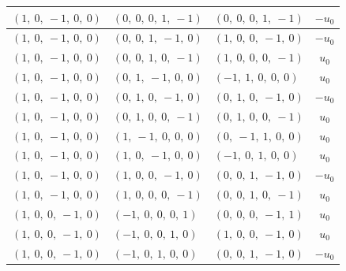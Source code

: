 \documentclass[11pt]{article}
\theoremstyle{definition}
\begin{document}
\begin{longtable}{|l|l|l|c|}
    \hline
    $\left( 1, \  0, \  -1, \  0, \  0\right)$ & $\left( 0, \  0, \  0, \  1, \  -1\right)$ & $\left( 0, \  0, \  0, \  1, \  -1\right)$ & $- u_{0}$ \\
    \hline
    $\left( 1, \  0, \  -1, \  0, \  0\right)$ & $\left( 0, \  0, \  1, \  -1, \  0\right)$ & $\left( 1, \  0, \  0, \  -1, \  0\right)$ & $- u_{0}$ \\
    \hline
    $\left( 1, \  0, \  -1, \  0, \  0\right)$ & $\left( 0, \  0, \  1, \  0, \  -1\right)$ & $\left( 1, \  0, \  0, \  0, \  -1\right)$ & $u_{0}$ \\
    \hline
    $\left( 1, \  0, \  -1, \  0, \  0\right)$ & $\left( 0, \  1, \  -1, \  0, \  0\right)$ & $\left( -1, \  1, \  0, \  0, \  0\right)$ & $u_{0}$ \\
    \hline
    $\left( 1, \  0, \  -1, \  0, \  0\right)$ & $\left( 0, \  1, \  0, \  -1, \  0\right)$ & $\left( 0, \  1, \  0, \  -1, \  0\right)$ & $- u_{0}$ \\
    \hline
    $\left( 1, \  0, \  -1, \  0, \  0\right)$ & $\left( 0, \  1, \  0, \  0, \  -1\right)$ & $\left( 0, \  1, \  0, \  0, \  -1\right)$ & $u_{0}$ \\
    \hline
    $\left( 1, \  0, \  -1, \  0, \  0\right)$ & $\left( 1, \  -1, \  0, \  0, \  0\right)$ & $\left( 0, \  -1, \  1, \  0, \  0\right)$ & $u_{0}$ \\
    \hline
    $\left( 1, \  0, \  -1, \  0, \  0\right)$ & $\left( 1, \  0, \  -1, \  0, \  0\right)$ & $\left( -1, \  0, \  1, \  0, \  0\right)$ & $u_{0}$ \\
    \hline
    $\left( 1, \  0, \  -1, \  0, \  0\right)$ & $\left( 1, \  0, \  0, \  -1, \  0\right)$ & $\left( 0, \  0, \  1, \  -1, \  0\right)$ & $- u_{0}$ \\
    \hline
    $\left( 1, \  0, \  -1, \  0, \  0\right)$ & $\left( 1, \  0, \  0, \  0, \  -1\right)$ & $\left( 0, \  0, \  1, \  0, \  -1\right)$ & $u_{0}$ \\
    \hline
    $\left( 1, \  0, \  0, \  -1, \  0\right)$ & $\left( -1, \  0, \  0, \  0, \  1\right)$ & $\left( 0, \  0, \  0, \  -1, \  1\right)$ & $u_{0}$ \\
    \hline
    $\left( 1, \  0, \  0, \  -1, \  0\right)$ & $\left( -1, \  0, \  0, \  1, \  0\right)$ & $\left( 1, \  0, \  0, \  -1, \  0\right)$ & $u_{0}$ \\
    \hline
    $\left( 1, \  0, \  0, \  -1, \  0\right)$ & $\left( -1, \  0, \  1, \  0, \  0\right)$ & $\left( 0, \  0, \  1, \  -1, \  0\right)$ & $- u_{0}$ \\

\end{longtable}
\end{document}
